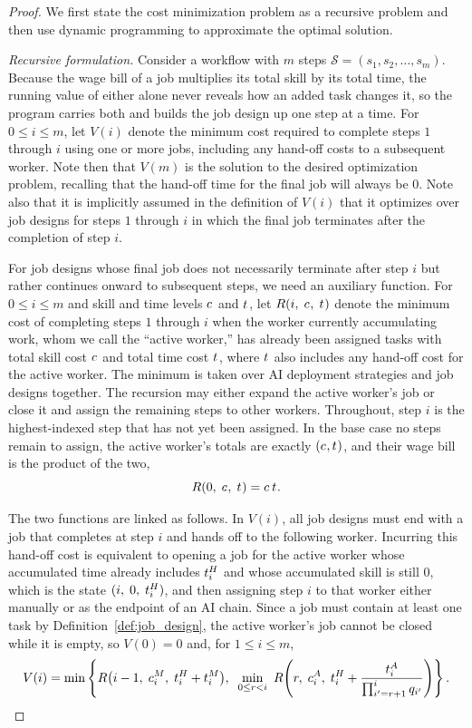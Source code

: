 \begin{proof}
We first state the cost minimization problem as a recursive problem and then use dynamic programming to approximate the optimal solution.

\emph{Recursive formulation.}
Consider a workflow with $m$ steps $\mathcal{S} = (s_1, s_2, \dotsc, s_m)$.
Because the wage bill of a job multiplies its total skill by its total time, the running value of either alone never reveals how an added task changes it, so the program carries both and builds the job design up one step at a time.
For $0 \leq i \leq m$, let $V(i)$ denote the minimum cost required to complete steps $1$ through $i$ using one or more jobs, including any hand-off costs to a subsequent worker.
Note then that $V(m)$ is the solution to the desired optimization problem, recalling that the hand-off time for the final job will always be $0$.
Note also that it is implicitly assumed in the definition of $V(i)$ that it optimizes over job designs for steps $1$ through $i$ in which the final job terminates after the completion of step $i$.

For job designs whose final job does not necessarily terminate after step $i$ but rather continues onward to subsequent steps, we need an auxiliary function.
For $0 \leq i \leq m$ and skill and time levels $c_{}$ and $t_{}$, let $R(i,\; c_{},\; t_{})$ denote the minimum cost of completing steps $1$ through $i$ when the worker currently accumulating work, whom we call the ``active worker,'' has already been assigned tasks with total skill cost $c_{}$ and total time cost $t_{}$, where $t_{}$ also includes any hand-off cost for the active worker.
The minimum is taken over AI deployment strategies and job designs together.
The recursion may either expand the active worker's job or close it and assign the remaining steps to other workers.
Throughout, step $i$ is the highest-indexed step that has not yet been assigned.
In the base case no steps remain to assign, the active worker's totals are exactly $(c_{}, t_{})$, and their wage bill is the product of the two,
\[ R(0,\; c_{},\; t_{}) = c_{}\,t_{}. \]

The two functions are linked as follows.
In $V(i)$, all job designs must end with a job that completes at step $i$ and hands off to the following worker.
Incurring this hand-off cost is equivalent to opening a job for the active worker whose accumulated time already includes $t^{H}_{i}$ and whose accumulated skill is still $0$, which is the state $(i,\; 0,\; t^{H}_{i})$, and then assigning step $i$ to that worker either manually or as the endpoint of an AI chain.
Since a job must contain at least one task by Definition~\ref{def:job_design}, the active worker's job cannot be closed while it is empty, so $V(0) = 0$ and, for $1 \leq i \leq m$,
\[
V(i) = \min\left\{ R\bigl(i-1,\; c^{M}_{i},\; t^{H}_{i} + t^{M}_{i}\bigr), \;\;
\min_{0 \le r < i}\ R\!\left(r,\; c^{A}_{i},\; t^{H}_{i} + \frac{t^{A}_{i}}{\prod_{i'=r+1}^{i} q_{i'}}\right) \right\}.
\]


\end{proof}
